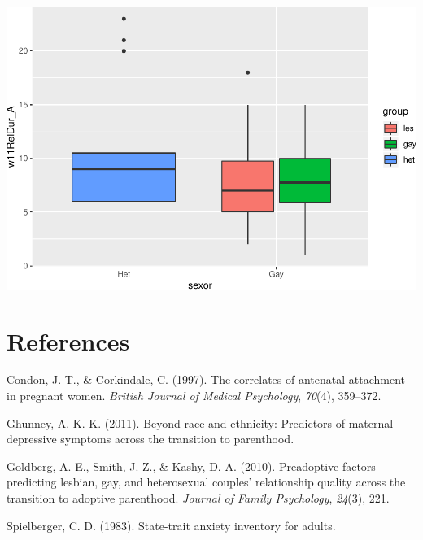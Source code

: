 \documentclass[man]{apa6}
\begin{document}
\includegraphics{measures_descriptive_stats_files/figure-latex/unnamed-chunk-3-1.pdf}

\newpage

\hypertarget{references}{%
\section{References}\label{references}}

\begingroup
\setlength{\parindent}{-0.5in}
\setlength{\leftskip}{0.5in}

\hypertarget{refs}{}
\leavevmode\hypertarget{ref-condon1997correlates}{}%
Condon, J. T., \& Corkindale, C. (1997). The correlates of antenatal attachment in pregnant women. \emph{British Journal of Medical Psychology}, \emph{70}(4), 359--372.

\leavevmode\hypertarget{ref-ghunney2011beyond}{}%
Ghunney, A. K.-K. (2011). Beyond race and ethnicity: Predictors of maternal depressive symptoms across the transition to parenthood.

\leavevmode\hypertarget{ref-goldberg2010preadoptive}{}%
Goldberg, A. E., Smith, J. Z., \& Kashy, D. A. (2010). Preadoptive factors predicting lesbian, gay, and heterosexual couples' relationship quality across the transition to adoptive parenthood. \emph{Journal of Family Psychology}, \emph{24}(3), 221.

\leavevmode\hypertarget{ref-spielberger1983state}{}%
Spielberger, C. D. (1983). State-trait anxiety inventory for adults.

\endgroup
\end{document}
